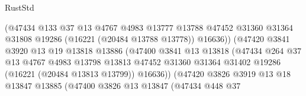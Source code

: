 \begin{lexlean}{RustStd}
\begin{coremodule}
                                      (@47434
                                        @133
                                        @37
                                        @13
                                        @4767
                                        @4983
                                        @13777
                                        @13788
                                        @47452
                                        @31360
                                        @31364
                                        @31808
                                        @19286
                                        (@16221 (@20484 @13788 @13778))
                                        @16636))
                                    (@47420
                                      @3841
                                      @3920
                                      @13
                                      @19
                                      @13818
                                      @13886
                                      (@47400
                                        @3841
                                        @13
                                        @13818
                                        (@47434
                                          @264
                                          @37
                                          @13
                                          @4767
                                          @4983
                                          @13798
                                          @13813
                                          @47452
                                          @31360
                                          @31364
                                          @31402
                                          @19286
                                          (@16221 (@20484 @13813 @13799))
                                          @16636))
                                      (@47420
                                        @3826
                                        @3919
                                        @13
                                        @18
                                        @13847
                                        @13885
                                        (@47400
                                          @3826
                                          @13
                                          @13847
                                          (@47434
                                            @448
                                            @37

\end{coremodule}
\end{lexlean}
